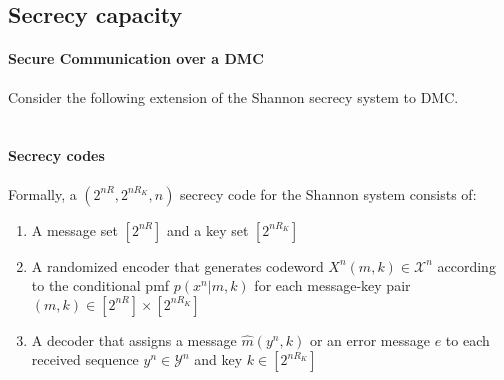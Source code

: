 \documentclass[a4paper, 11pt, openany]{book}
\numberwithin{equation}{section}
\theoremstyle{plain}
\theoremstyle{definition}
\newcommand{\alphabet}[1]{\mathcal{#1}}
\begin{document}
\subsection{Secrecy capacity}



\paragraph{Secure Communication over a DMC}
Consider the following extension of the Shannon secrecy system to DMC.\\
~\\
\begin{center}
\end{center}


\paragraph{Secrecy codes}
Formally, a $(2^{nR}, 2^{n R_K}, n)$ secrecy code for the Shannon system consists of:
\begin{enumerate}
	\item A message set $[2^{nR}]$ and a key set $[2^{nR_K}]$

	\item A randomized encoder that generates codeword $X^n(m, k) \in \alphabet{X}^n$ according to the conditional pmf $p(x^n|m, k)$ for each message-key pair
	$(m, k) \in [2^{nR}] \times [2^{nR_K}]$
	
	\item A decoder that assigns a message $\hat{m}(y^n, k)$ or an error message $e$ to each
	received sequence $y^n \in \alphabet{Y}^n$ and key $k \in [2^{nR_K}]$
\end{enumerate}
\end{document}

